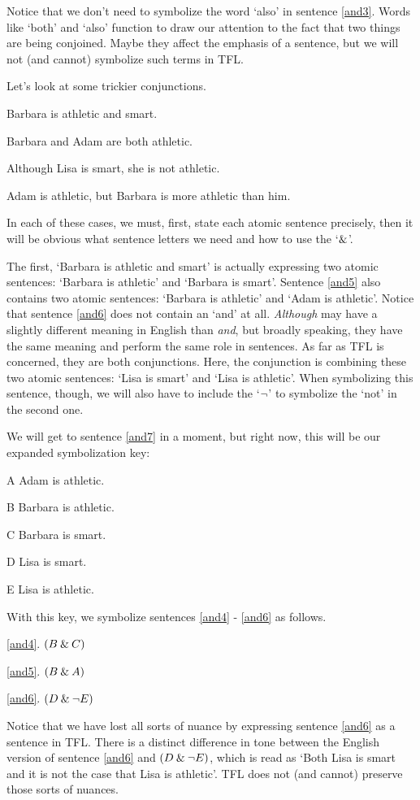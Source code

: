 Notice that we don't need to symbolize the word `also' in sentence \ref{and3}. Words like `both' and `also' function to draw our attention to the fact that two things are being conjoined. Maybe they affect the emphasis of a sentence, but we will not (and cannot) symbolize such terms in TFL. 

Let's look at some trickier conjunctions.
	\begin{earg}
		\item[\ex{and4}]Barbara is athletic and smart.
		\item[\ex{and5}]Barbara and Adam are both athletic.
		\item[\ex{and6}]Although Lisa is smart, she is not athletic.
		\item[\ex{and7}]Adam is athletic, but Barbara is more athletic than him.
	\end{earg}
In each of these cases, we must, first, state each atomic sentence precisely, then it will be obvious what sentence letters we need and how to use the `$\mathbin{\&}$'. 

The first, `Barbara is athletic and smart' is actually expressing two atomic sentences: `Barbara is athletic' and `Barbara is smart'. Sentence \ref{and5} also contains two atomic sentences: `Barbara is athletic' and `Adam is athletic'. Notice that sentence \ref{and6} does not contain an `and' at all. \textit{Although} may have a slightly different meaning in English than \textit{and}, but broadly speaking, they have the same meaning and perform the same role in sentences. As far as TFL is concerned, they are both conjunctions. Here, the conjunction is combining these two atomic sentences: `Lisa is smart' and `Lisa is athletic'. When symbolizing this sentence, though, we will also have to include the `${\neg}$' to symbolize the `not' in the second one.  

We will get to sentence \ref{and7} in a moment, but right now, this will be our expanded symbolization key:
	\begin{ekey}
		\item[A] Adam is athletic.
		\item[B] Barbara is athletic.
		\item[C] Barbara is smart.
		\item[D] Lisa is smart.
		\item[E] Lisa is athletic.
	\end{ekey}
With this key, we symbolize sentences \ref{and4} - \ref{and6} as follows.
	\begin{earg}
		\item[\ref{and4}.] $(B \mathbin{\&} C)$
		\item[\ref{and5}.] $(B \mathbin{\&} A)$
		\item[\ref{and6}.] $(D \mathbin{\&} {\neg} E)$ 
	\end{earg}
Notice that we have lost all sorts of nuance by expressing sentence \ref{and6} as a sentence in TFL. There is a distinct difference in tone between the English version of sentence \ref{and6} and $(D \mathbin{\&} {\neg} E)$, which is read as `Both Lisa is smart and it is not the case that Lisa is athletic'. TFL does not (and cannot) preserve those sorts of nuances.

